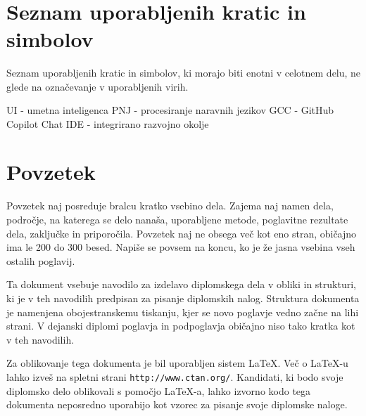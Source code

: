 \documentclass[12pt,a4paper]{book}
\begin{document}
\ \thispagestyle{empty}

\newpage


\renewcommand\thepage{} 
\tableofcontents 
\renewcommand\thepage{\arabic{page}}

\thispagestyle{empty}



\chapter*{Seznam uporabljenih kratic in simbolov}

\thispagestyle{empty}

Seznam uporabljenih kratic in simbolov, ki morajo biti enotni v celotnem delu, ne glede na označevanje v uporabljenih virih.

UI - umetna inteligenca
PNJ - procesiranje naravnih jezikov
GCC - GitHub Copilot Chat
IDE - integrirano razvojno okolje


\clearpage{\pagestyle{empty}\cleardoublepage}


\setcounter{page}{1}

\chapter*{Povzetek}

Povzetek naj posreduje bralcu kratko vsebino dela. Zajema naj namen dela, področje, na katerega se delo nanaša,
uporabljene metode, poglavitne rezultate dela, zaključke in priporočila. 
Povzetek naj ne obsega več kot eno stran, obi\v cajno ima le 200 do 300 besed. Napiše se povsem na koncu,
ko je že jasna vsebina vseh ostalih poglavij.

Ta dokument vsebuje navodilo za izdelavo diplomskega dela v obliki in strukturi, ki je v teh navodilih predpisan za
pisanje diplomskih nalog. Struktura dokumenta je namenjena obojestranskemu tiskanju, kjer se novo poglavje vedno za\v cne na lihi strani.
V dejanski diplomi poglavja in podpogla\-vja  obi\v cajno niso tako kratka kot v teh navodilih.

Za oblikovanje tega dokumenta je bil uporabljen sistem \LaTeX.
Ve\v c o \LaTeX-u lahko izve\v s na spletni strani \texttt{http://www.ctan.org/}.
Kandidati, ki bodo svoje diplomsko delo oblikovali s pomo\v cjo
\LaTeX-a, lahko izvorno kodo tega dokumenta neposredno uporabijo kot vzorec za pisanje svoje diplomske naloge.
\end{document}
